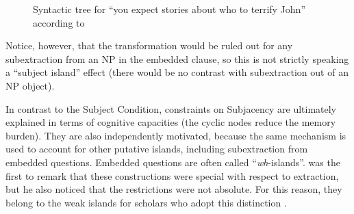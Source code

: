 \begin{figure}[ht]
\centering
{}
\caption{Syntactic tree for ``you expect stories about who to terrify John'' according to \citet{Chomsky.1973}}
    \label{fig:stories-about-tree-S}
\end{figure}
 

Notice, however, that the transformation would be ruled out for any subextraction from an NP in the embedded clause, so this is not strictly speaking a ``subject island'' effect (there would be no contrast with subextraction out of an NP object). 

In contrast to the Subject Condition, constraints on Subjacency are ultimately explained in terms of cognitive capacities (the cyclic nodes  reduce the memory burden). %
They are also independently motivated, because the same mechanism is used to account for other putative islands, including subextraction from embedded questions. 
Embedded questions are often called ``\textit{wh}-islands''. \citet{Ross.1967} was the first to remark that these constructions were special with respect to extraction, but he also noticed that the restrictions were not absolute. For this reason, they belong to the weak islands for scholars who adopt this distinction \citep[e.g.][]{Cinque.1990}.

